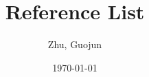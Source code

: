 \documentclass{article}
\title{Reference List}
\author{Zhu, Guojun}
\date{\today}
\begin{document}
\maketitle

\nocite{*}




%

%
\end{document}
